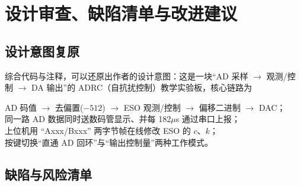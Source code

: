 \section{设计审查、缺陷清单与改进建议}

\subsection{设计意图复原}

综合代码与注释，可以还原出作者的设计意图：这是一块“AD 采样 $\rightarrow$ 观测/控制
$\rightarrow$ DA 输出”的 ADRC（自抗扰控制）教学实验板，核心链路为

\begin{center}
\small
AD 码值 $\rightarrow$ 去偏置($-512$) $\rightarrow$ ESO 观测/控制 $\rightarrow$ 偏移二进制
$\rightarrow$ DAC；\\
同一路 AD 数据同时送数码管显示、并每 182$\mu$s 通过串口上报；\\
上位机用 “Axxx/Bxxx” 两字节帧在线修改 ESO 的 $c$、$k$；\\
按键切换“直通 AD 回环”与“输出控制量”两种工作模式。
\end{center}

\subsection{缺陷与风险清单}

